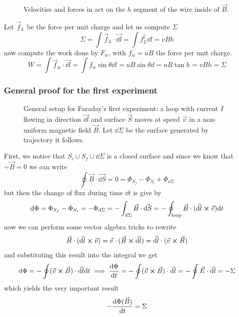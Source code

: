 \documentclass[12pt]{extarticle}
\begin{document}
\begin{figure}[H]
    \centering
    
    \caption{Velocities and forces in act on the $h$ segment of the wire inside of $\vec B$.}
\end{figure}

Let $\vec f_L$ be the force per unit charge and let us compute $\Sigma$
\begin{equation}
    \Sigma = \int \vec f_L \cdot \vec{\dd l } = \int f_L^{\parallel} \dd l = v B h
\end{equation}
now compute the work done by $F_w$, with $f_w = u B$ the force per unit charge.
\begin{equation}
    W = \int \vec f_w \cdot \vec{\dd l } = \int f_w \sin \theta \dd l = u B \sin \theta d = u B \tan h = v B h = \Sigma
\end{equation}

\subsubsection{General proof for the first experiment}

\begin{figure}[H]
    \centering
    
    \caption{General setup for Faraday's first experiment: a loop with current $I$ flowing in direction $\vec {\dd l}$
        and surface $\vec S$ moves at speed $\vec v$ in a non-uniform magnetic field $\vec B$.
        Let $\dd \Sigma$ be the surface generated by trajectory it follows.}
\end{figure}

First, we notice that $S_i \cup S_f \cup \dd \Sigma$ is a closed surface and since we know that $\div \vec B = 0$
we can write
\begin{equation}
    \oint \vec B \cdot \vec{\dd S } = 0 = \Phi_{S_f} - \Phi_{S_i} + \Phi_{\dd \Sigma}
\end{equation}
but then the change of flux during time $\dd t$ is give by
\begin{equation}
    \dd \Phi = \Phi_{S_f} - \Phi_{S_i} = - \Phi_{\dd \Sigma}
    = - \int_{\dd \Sigma} \vec B \cdot \vec{\dd S}
    = -\oint_\text{loop} \vec B \cdot (\vec{\dd l} \cross \vec v) \dd t
\end{equation}
now we can perform some vector algebra tricks to rewrite
\begin{equation}
    \vec B \cdot (\vec {\dd l} \cross \vec v) = \vec v \cdot (\vec B \cross \vec{\dd l})
    = \vec{\dd l} \cdot (\vec v \cross \vec B)
\end{equation}
and substituting this result into the integral we get
\begin{equation}
    \dd \Phi = - \oint (\vec v \cross \vec B ) \cdot \vec{\dd l} \dd t
    \implies \dv{\Phi}{t} = - \oint (\vec v \cross \vec B) \cdot \vec{\dd l}
    = - \oint \vec E \cdot \vec{\dd l} = -\Sigma
\end{equation}
which yields the very important result
\begin{equation}
    - \dv{\Phi(\vec B)}{t} = \Sigma
\end{equation}
\end{document}
